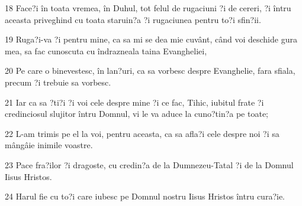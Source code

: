 \par 18 Face?i în toata vremea, în Duhul, tot felul de rugaciuni ?i de cereri, ?i întru aceasta priveghind cu toata staruin?a ?i rugaciunea pentru to?i sfin?ii.
\par 19 Ruga?i-va ?i pentru mine, ca sa mi se dea mie cuvânt, când voi deschide gura mea, sa fac cunoscuta cu îndrazneala taina Evangheliei,
\par 20 Pe care o binevestesc, în lan?uri, ca sa vorbesc despre Evanghelie, fara sfiala, precum ?i trebuie sa vorbesc.
\par 21 Iar ca sa ?ti?i ?i voi cele despre mine ?i ce fac, Tihic, iubitul frate ?i credinciosul slujitor întru Domnul, vi le va aduce la cuno?tin?a pe toate;
\par 22 L-am trimis pe el la voi, pentru aceasta, ca sa afla?i cele despre noi ?i sa mângâie inimile voastre.
\par 23 Pace fra?ilor ?i dragoste, cu credin?a de la Dumnezeu-Tatal ?i de la Domnul Iisus Hristos.
\par 24 Harul fie cu to?i care iubesc pe Domnul nostru Iisus Hristos întru cura?ie.


